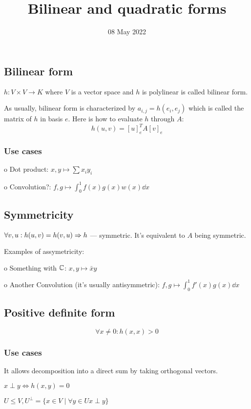 
\title{Bilinear and quadratic forms}
\author{}
\date{08 May 2022}

\maketitle

\subsection{Bilinear form}
$h: V \times V \to K$ where $V$ is a vector space and $h$ is polylinear
is called bilinear form.

As usually, bilinear form is characterized by $a_{i,j} = h(e_i, e_j)$ which
is called the matrix of $h$ in basis $e$.
Here is how to evaluate $h$ through $A$:
\[ h(u, v) = [u]_e^T A [v]_e \] 

\subsubsection*{Use cases}

o Dot product: $x, y \mapsto \sum x_i y_i $

o Convolution?: $f, g \mapsto \int_0^1 f(x)g(x)w(x) \dd{x}$

\subsection*{Symmetricity}
$\forall v, u: h(u, v) = h(v, u) \Rightarrow h$ --- symmetric.
It's equivalent to $A$ being symmetric.


Examples of assymetricity:

o Something with $\mathbb C$: $x, y \mapsto \bar x y$

o Another Convolution (it's usually antisymmetric):
$ f, g \mapsto \int_0^1 f'(x)g(x) \dd{x}$

\subsection*{Positive definite form}
\[ \forall x \ne 0: h(x, x) > 0 \]  

\subsubsection*{Use cases}

It allows decomposition into a direct sum by taking orthogonal vectors.

\begin{df} $x \perp y \iff h(x, y) = 0$ \end{df}
\begin{df} $U \le V, U^\perp = \{ x \in V \mid \forall y \in U x \perp y \} $
\end{df}

